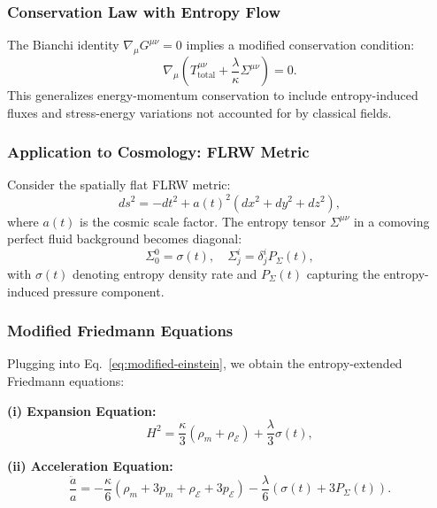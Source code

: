\documentclass[12pt]{article}
\begin{document}
\subsubsection*{Conservation Law with Entropy Flow}

The Bianchi identity \( \nabla_\mu G^{\mu\nu} = 0 \) implies a modified conservation condition:
\begin{equation} \label{eq:conservation-entropy}
\nabla_\mu \left( T^{\mu\nu}_{\text{total}} + \frac{\lambda}{\kappa} \Sigma^{\mu\nu} \right) = 0.
\end{equation}
This generalizes energy-momentum conservation to include entropy-induced fluxes and stress-energy variations not accounted for by classical fields.

\subsubsection*{Application to Cosmology: FLRW Metric}

Consider the spatially flat FLRW metric:
\begin{equation} \label{eq:flrw-metric}
ds^2 = -dt^2 + a(t)^2 \left( dx^2 + dy^2 + dz^2 \right),
\end{equation}
where \( a(t) \) is the cosmic scale factor. The entropy tensor \( \Sigma^{\mu\nu} \) in a comoving perfect fluid background becomes diagonal:
\begin{equation} \label{eq:sigma00-cosmo}
\Sigma^0_0 = \sigma(t), \quad \Sigma^i_j = \delta^i_j P_{\Sigma}(t),
\end{equation}
with \( \sigma(t) \) denoting entropy density rate and \( P_{\Sigma}(t) \) capturing the entropy-induced pressure component.

\subsubsection*{Modified Friedmann Equations}

Plugging into Eq.~\eqref{eq:modified-einstein}, we obtain the entropy-extended Friedmann equations:

\textbf{(i) Expansion Equation:}
\begin{equation} \label{eq:modified-friedmann1}
H^2 = \frac{\kappa}{3} \left( \rho_m + \rho_{\mathcal{E}} \right) + \frac{\lambda}{3} \sigma(t),
\end{equation}

\textbf{(ii) Acceleration Equation:}
\begin{equation} \label{eq:modified-friedmann2}
\frac{\ddot{a}}{a} = -\frac{\kappa}{6} \left( \rho_m + 3p_m + \rho_{\mathcal{E}} + 3p_{\mathcal{E}} \right) - \frac{\lambda}{6} \left( \sigma(t) + 3 P_{\Sigma}(t) \right).
\end{equation}
\end{document}
